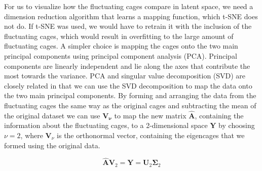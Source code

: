 \documentclass[journal=jacsat,manuscript=article]{achemso}
\begin{document}
{For us to visualize how the fluctuating cages compare in latent space, we need a dimension reduction algorithm that learns a mapping function, which t-SNE does not do. If t-SNE was used, we would have to retrain it with the inclusion of the fluctuating cages, which would result in overfitting to the large amount of fluctuating cages. A simpler choice is mapping the cages onto the two main principal components using principal component analysis (PCA). Principal components are linearly independent and lie along the axes that contribute the most towards the variance. PCA and singular value decomposition (SVD) are closely related in that we can use the SVD decomposition to map the data onto the two main principal components. By forming and arranging the data from the fluctuating cages the same way as the original cages and subtracting the mean of the original dataset we can use $\mathbf{V_\nu}$ to map the new matrix $\hat{\mathbf{A}}$, containing the information about the fluctuating cages, to a 2-dimensional space $\mathbf{Y}$ by choosing $\nu = 2$, where $\mathbf{V}_\nu$ is the orthonormal vector, containing the eigencages that we formed using the original data.

\begin{equation}
\hat{\mathbf{A}} \mathbf{V}_{2} = \mathbf{Y} = \mathbf{U}_{2}\mathbf{\Sigma}_{2}
\label{eq:pca}
\end{equation}

}
\end{document}
